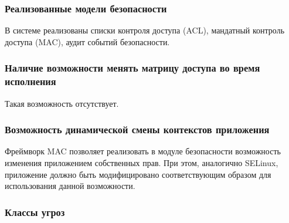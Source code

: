 \begin{comment}
На данный момент 
существуют следующие политики: 

mac\_biba – Реализация политики Biba, во многом 
схожей с MLS. Позволяет присваивать объектам и 
субъектам системы атрибуты доступа, которые образую 
иерархию уровней. Все операции над информацией в 
системе контролируются исходя из уровней 
взаимодействующих сущностей. 

mac\_ifoff позволяет администраторам контролировать 
сетевой трафик. 

mac\_lomac (Low-watermark MAC) еще одна 
реализация многоуровневого контроля доступа. 

mac\_bsdextended (file system firewall) Система 
защиты файлов, основанная на определении прав 
доступа на основании роли пользователя. 

mac\_mls реализация политики MLS. Объекты 
классифицируются некоторым образом, субъектам 
присваивают уровень доступа. 
\end{comment} 

\subsubsection{Реализованные модели безопасности}

В системе реализованы списки контроля доступа (ACL), 
мандатный контроль доступа (MAC), аудит событий
безопасности. 

\subsubsection{Наличие возможности менять матрицу доступа 
	 во время исполнения } 
	 
Такая возможность отсутствует. 

\subsubsection{Возможность динамической смены контекстов приложения} 

Фреймворк MAC позволяет реализовать в модуле 
безопасности возможность изменения приложением 
собственных прав. При этом, аналогично SELinux, 
приложение должно быть модифицировано соответствующим 
образом для использования данной возможности. 

\subsubsection{Классы угроз} 

